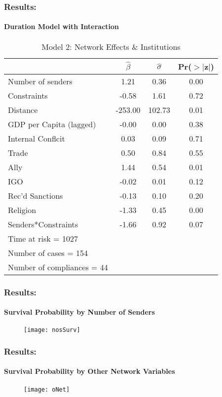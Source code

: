 \documentclass{beamer}
\begin{document}
\begin{frame}
\frametitle{Results:}
\framesubtitle{Duration Model with Interaction}

%
\begin{table}[ht]
\caption{Model 2: Network Effects \& Institutions}
\begin{center}
	\begin{tabular}{lccc}
	  \hline\hline
	 &$\hat{\beta}$&$\hat{\sigma}$& Pr($>$$|$z$|$) \\
  \hline
Number of senders & 1.21 & 0.36 & 0.00 \\ 
  Constraints & -0.58 & 1.61 & 0.72 \\ 
  Distance & -253.00 & 102.73 & 0.01 \\ 
  GDP per Capita (lagged) & -0.00 & 0.00 & 0.38 \\ 
  Internal Conflcit & 0.03 & 0.09 & 0.71 \\ 
  Trade & 0.50 & 0.84 & 0.55 \\ 
  Ally & 1.44 & 0.54 & 0.01 \\ 
  IGO & -0.02 & 0.01 & 0.12 \\ 
  Rec'd Sanctions & -0.13 & 0.10 & 0.20 \\ 
  Religion & -1.33 & 0.45 & 0.00 \\ 
  Senders*Constraints & -1.66 & 0.92 & 0.07 \\ 
   \hline
   Time at risk = 1027 &&&\\
	 Number of cases = 154 &&&\\
   Number of compliances = 44 &&&\\
  \hline\hline
\end{tabular}
\end{center}
\end{table}

\end{frame}

\begin{frame}
\frametitle{Results:}
\framesubtitle{Survival Probability by Number of Senders}

\vspace{0.7cm}
\begin{figure}[ht]
	\centering
	\texttt{[image: nosSurv]}
\end{figure}

\end{frame}

\begin{frame}
\frametitle{Results:}	
\framesubtitle{Survival Probability by Other Network Variables}

\begin{figure}[ht]
	\centering
	\texttt{[image: oNet]}
\end{figure}

\end{frame}
\end{document}
